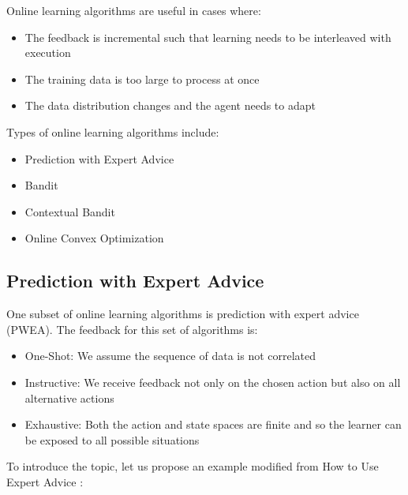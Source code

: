 \documentclass[11pt]{article}
\begin{document}
Online learning algorithms are useful in cases where:
\begin{itemize}
  \item The feedback is incremental such that learning needs to be interleaved with execution
  \item The training data is too large to process at once
  \item The data distribution changes and the agent needs to adapt
\end{itemize}

Types of online learning algorithms include: 
\begin{itemize}
  \item Prediction with Expert Advice
  \item Bandit
  \item Contextual Bandit
  \item Online Convex Optimization
\end{itemize}

\subsection{Prediction with Expert Advice}
One subset of online learning algorithms is prediction with expert advice (PWEA). The feedback for this set of algorithms is:

\begin{itemize}
    \item One-Shot: We assume the sequence of data is not correlated
    \item Instructive: We receive feedback not only on the chosen action but also on all alternative actions
    \item Exhaustive: Both the action and state spaces are finite and so the learner can be exposed to all possible situations
\end{itemize}

To introduce the topic, let us propose an example modified from How to Use Expert Advice \cite{pwea}:
\end{document}
